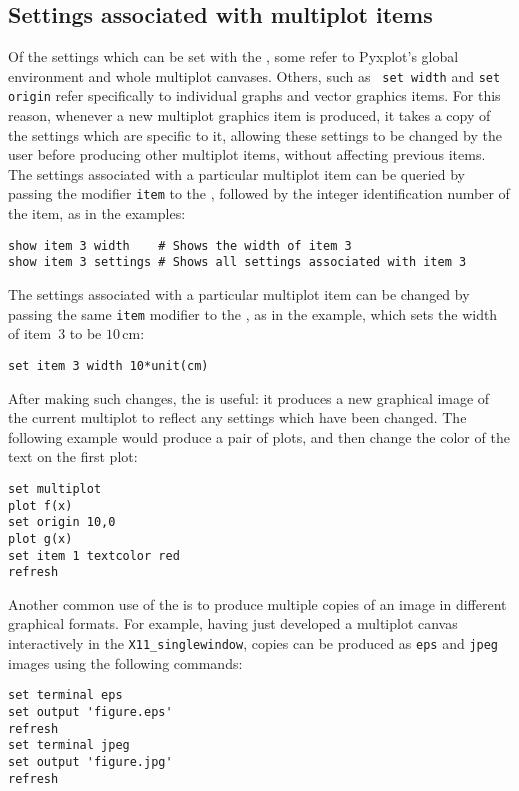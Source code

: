 \subsection{Settings associated with multiplot items}

Of the settings which can be set with the , some refer to
Pyxplot's global environment and whole multiplot canvases. Others, such as {\tt
set width} and {\tt set origin} refer specifically to individual graphs and
vector graphics items. For this reason, whenever a new multiplot graphics item
is produced, it takes a copy of the settings which are specific to it, allowing
these settings to be changed by the user before producing other multiplot
items, without affecting previous items. The settings associated with a
particular multiplot item can be queried by passing the modifier {\tt item} to
the , followed by the integer identification number of the item,
as in the examples:
\begin{verbatim}
show item 3 width    # Shows the width of item 3
show item 3 settings # Shows all settings associated with item 3
\end{verbatim}

The settings associated with a particular multiplot item can be changed by
passing the same {\tt item} modifier to the , as in the example,
which sets the width of item~3 to be $10\,\mathrm{cm}$:
\begin{verbatim}
set item 3 width 10*unit(cm)
\end{verbatim}
After making such changes, the  is useful: it produces a new
graphical image of the current multiplot to reflect any settings which have
been changed. The following example would produce a pair of plots, and then
change the color of the text on the first plot:
\begin{verbatim}
set multiplot
plot f(x)
set origin 10,0
plot g(x)
set item 1 textcolor red
refresh
\end{verbatim}

Another common use of the  is to produce multiple
copies of an image in different graphical formats. For example, having just
developed a multiplot canvas interactively in the {\tt X11\_singlewindow},
copies can be produced as {\tt eps} and {\tt jpeg} images using the following
commands:
\begin{verbatim}
set terminal eps
set output 'figure.eps'
refresh
set terminal jpeg
set output 'figure.jpg'
refresh
\end{verbatim}

